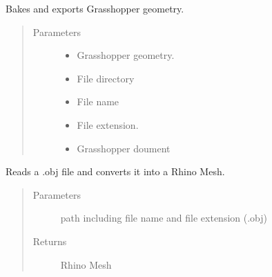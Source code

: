 \documentclass[letterpaper,10pt,english]{sphinxmanual}
\begin{document}
\begin{fulllineitems}
\label{\detokenize{lib:livestock.lib.geometry.bake_export_delete}}
Bakes and exports Grasshopper geometry.
\begin{quote}\begin{description}
\item[{Parameters}] \leavevmode\begin{itemize}
\item {} 
 \textendash{} Grasshopper geometry.

\item {} 
 \textendash{} File directory

\item {} 
 \textendash{} File name

\item {} 
 \textendash{} File extension.

\item {} 
 \textendash{} Grasshopper doument

\end{itemize}

\end{description}\end{quote}

\end{fulllineitems}


\begin{fulllineitems}
\label{\detokenize{lib:livestock.lib.geometry.import_obj}}
Reads a .obj file and converts it into a Rhino Mesh.
\begin{quote}\begin{description}
\item[{Parameters}] \leavevmode
{} \textendash{} path including file name and file extension (.obj)

\item[{Returns}] \leavevmode
Rhino Mesh

\end{description}\end{quote}

\end{fulllineitems}
\end{document}
